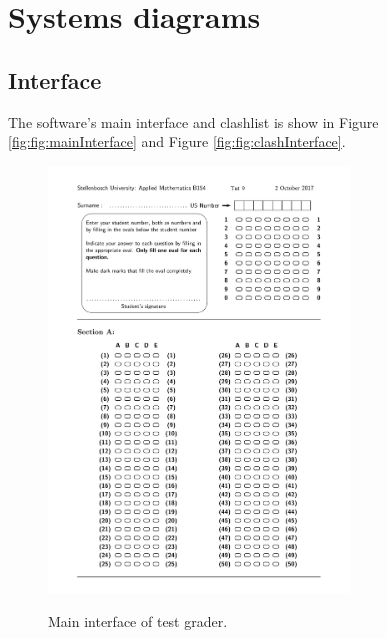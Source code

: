\chapter{Systems diagrams}
\label{ap:Algorithms}
\graphicspath{{Appendix4/Appendix4figures/}}

\section{Interface}

The software's main interface and clashlist is show in Figure \ref{fig:fig:mainInterface} and Figure \ref{fig:fig:clashInterface}.

\begin{figure}
  \centering
  \includegraphics[width=8cm]{mainInterface}\\
  \caption{Main interface of test grader.}
  \label{fig:mainInterface}
\end{figure}

